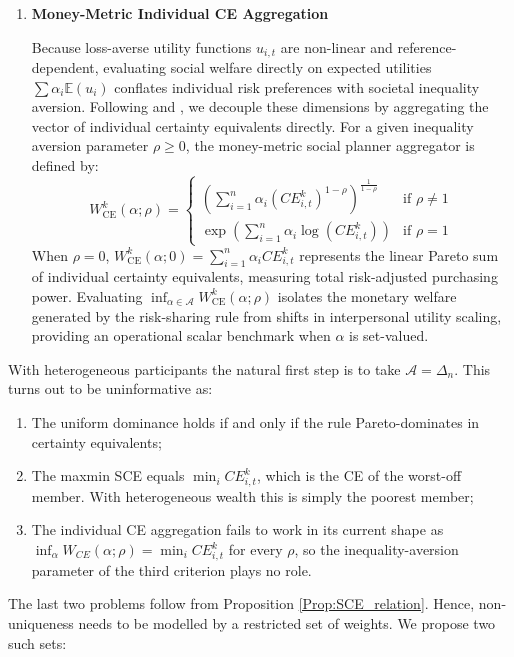 \documentclass[11pt,a4paper]{article}
\theoremstyle{definition}
\theoremstyle{plain}
\theoremstyle{remark}
\newcommand{\E}{\mathbb{E}}
\newcommand{\1}{\mathbf{1}}
\begin{document}
\begin{enumerate}
    \item \textbf{Money-Metric Individual CE Aggregation}
    
    Because loss-averse utility functions $u_{i,t}$ are non-linear and reference-dependent, evaluating social welfare directly on expected utilities $\sum \alpha_i \E(u_i)$ conflates individual risk preferences with societal inequality aversion. Following \citet{Atkinson_1970} and \citet{Grantetal2010}, we decouple these dimensions by aggregating the vector of individual certainty equivalents directly. For a given inequality aversion parameter $\rho \geq 0$, the money-metric social planner aggregator is defined by:
    \begin{equation}
        W_{\text{CE}}^k(\alpha; \rho) = \begin{cases} \left( \sum_{i=1}^n \alpha_i (CE_{i,t}^k)^{1-\rho} \right)^{\frac{1}{1-\rho}} & \text{if } \rho \neq 1 \\ \exp\left( \sum_{i=1}^n \alpha_i \log(CE_{i,t}^k) \right) & \text{if } \rho = 1 \end{cases}
    \end{equation}
    When $\rho = 0$, $W_{\text{CE}}^k(\alpha; 0) = \sum_{i=1}^n \alpha_i CE_{i,t}^k$ represents the linear Pareto sum of individual certainty equivalents, measuring total risk-adjusted purchasing power. Evaluating $\inf_{\alpha \in \mathcal{A}} W_{\text{CE}}^k(\alpha; \rho)$ isolates the monetary welfare generated by the risk-sharing rule from shifts in interpersonal utility scaling, providing an operational scalar benchmark when $\alpha$ is set-valued.
\end{enumerate}
With heterogeneous participants the natural first step is to take $\mathcal{A} = \Delta_n$. This turns out to be uninformative as:
\begin{enumerate}
    \item The uniform dominance holds if and only if the rule Pareto-dominates in certainty equivalents;
    \item The maxmin SCE \citep{Gilboa_Schmeidler_1989_maxmin} equals $\min_i CE_{i,t}^k$, which is the CE of the worst-off member. With heterogeneous wealth this is simply the poorest member;
    \item The individual CE aggregation fails to work in its current shape as $\inf_\alpha W_{CE}(\alpha;\rho)=\min_iCE^k_{i,t}$ for every $\rho$, so the inequality-aversion parameter of the third criterion plays no role.
\end{enumerate}
The last two problems follow from Proposition \ref{Prop:SCE_relation}. Hence, non-uniqueness needs to be modelled by a restricted set of weights. We propose two such sets:
\end{document}
